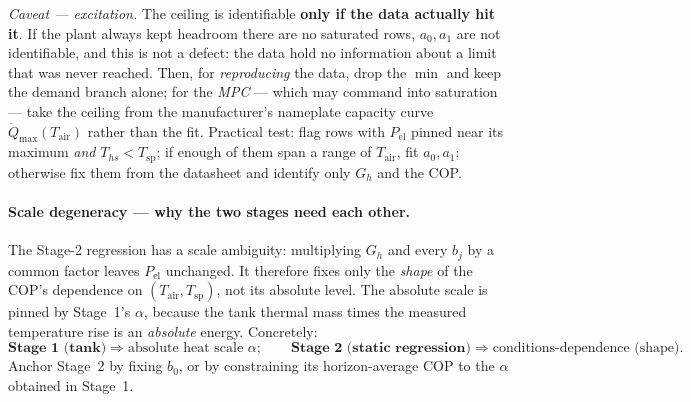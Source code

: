 \documentclass[11pt,a4paper]{article}
\newcommand{\Qmax}{\dot{Q}_{\max}}
\newcommand{\Ths}{T_{hs}}          %
\newcommand{\Tsp}{T_{\mathrm{sp}}} %
\newcommand{\Tair}{T_{\mathrm{air}}}
\newcommand{\Pel}{P_{\mathrm{el}}}
\begin{document}
\emph{Caveat --- excitation.} The ceiling is identifiable \textbf{only if the data
actually hit it}. If the plant always kept headroom there are no saturated rows,
$a_0,a_1$ are not identifiable, and this is not a defect: the data hold no
information about a limit that was never reached. Then, for \emph{reproducing} the
data, drop the $\min$ and keep the demand branch alone; for the \emph{MPC} --- which
may command into saturation --- take the ceiling from the manufacturer's nameplate
capacity curve $\Qmax(\Tair)$ rather than the fit. Practical test: flag rows with
$\Pel$ pinned near its maximum \emph{and} $\Ths<\Tsp$; if enough of them span a range
of $\Tair$, fit $a_0,a_1$; otherwise fix them from the datasheet and identify only
$G_h$ and the COP.

\paragraph{Scale degeneracy --- why the two stages need each other.}
The Stage-2 regression has a scale ambiguity: multiplying $G_h$ and every $b_j$ by
a common factor leaves $\Pel$ unchanged. It therefore fixes only the \emph{shape}
of the COP's dependence on $(\Tair,\Tsp)$, not its absolute level. The absolute
scale is pinned by Stage~1's $\alpha$, because the tank thermal mass times the
measured temperature rise is an \emph{absolute} energy. Concretely:
\[
  \textbf{Stage 1 (tank)} \Rightarrow \text{absolute heat scale } \alpha;
  \qquad
  \textbf{Stage 2 (static regression)} \Rightarrow \text{conditions-dependence (shape)} .
\]
Anchor Stage~2 by fixing $b_0$, or by constraining its horizon-average COP to the
$\alpha$ obtained in Stage~1.
\end{document}
